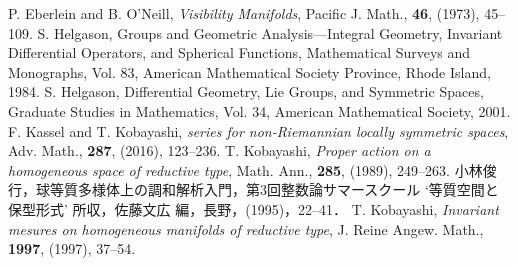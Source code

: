  P. Eberlein and B. O'Neill, \textit{Visibility Manifolds}, Pacific J. Math., \textbf{46}, (1973), 45--109.
 S. Helgason, Groups and Geometric Analysis---Integral Geometry, Invariant Differential Operators, and Spherical Functions, Mathematical Surveys and Monographs, Vol. 83, American Mathematical Society Province, Rhode Island, 1984.
 S. Helgason, Differential Geometry, Lie Groups, and Symmetric Spaces, Graduate Studies in Mathematics, Vol. 34, American Mathematical Society, 2001.
 F. Kassel and T. Kobayashi, \textit{{\Poincare} series for non-Riemannian locally symmetric spaces}, Adv. Math., \textbf{287}, (2016), 123--236.
 T. Kobayashi, 
  \textit{Proper action on a homogeneous space of reductive type},
  Math. Ann., \textbf{285}, (1989), 249--263.  
 小林俊行，球等質多様体上の調和解析入門，第3回整数論サマースクール `等質空間と保型形式' 所収，佐藤文広 編，長野，(1995)，22--41．
 T. Kobayashi, \textit{Invariant mesures on homogeneous manifolds of reductive type}, J. Reine Angew. Math., \textbf{1997}, (1997), 37--54.

